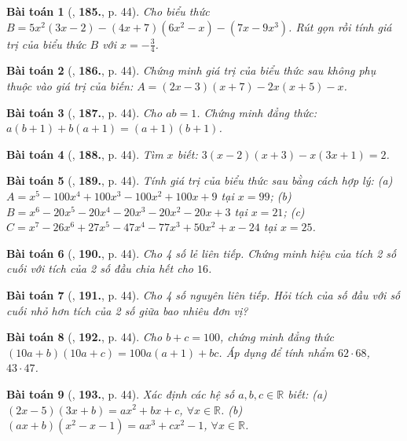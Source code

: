 \documentclass{article}
\numberwithin{equation}{section}
\newtheorem{baitoan}{Bài toán}
\begin{document}
\begin{baitoan}[\cite{Tuyen_Toan_7}, \textbf{185.}, p. 44]
	Cho biểu thức $B = 5x^2(3x - 2) - (4x + 7)(6x^2 - x) - (7x - 9x^3)$. Rút gọn rồi  tính giá trị của biểu thức $B$ với $x = -\frac{3}{4}$.
\end{baitoan}

\begin{baitoan}[\cite{Tuyen_Toan_7}, \textbf{186.}, p. 44]
	Chứng minh giá trị của biểu thức sau không phụ thuộc vào giá trị của biến: $A = (2x - 3)(x + 7) - 2x(x + 5) - x$. 
\end{baitoan}

\begin{baitoan}[\cite{Tuyen_Toan_7}, \textbf{187.}, p. 44]
	Cho $ab = 1$. Chứng minh đẳng thức: $a(b + 1) + b(a + 1) = (a + 1)(b + 1)$.
\end{baitoan}

\begin{baitoan}[\cite{Tuyen_Toan_7}, \textbf{188.}, p. 44]
	Tìm $x$ biết: $3(x - 2)(x + 3) - x(3x + 1) = 2$.
\end{baitoan}

\begin{baitoan}[\cite{Tuyen_Toan_7}, \textbf{189.}, p. 44]
	Tính giá trị của biểu thức sau bằng cách hợp lý: (a) $A = x^5 - 100x^4 + 100x^3 - 100x^2 + 100x + 9$ tại $x = 99$; (b) $B = x^6 - 20x^5 - 20x^4 - 20x^3 - 20x^2 - 20x + 3$ tại $x = 21$; (c) $C = x^7 - 26x^6 + 27x^5 - 47x^4 - 77x^3 + 50x^2 + x - 24$ tại $x = 25$.
\end{baitoan}

\begin{baitoan}[\cite{Tuyen_Toan_7}, \textbf{190.}, p. 44]
	Cho 4 số lẻ liên tiếp. Chứng minh hiệu của tích 2 số cuối với tích của 2 số đầu chia hết cho $16$.
\end{baitoan}

\begin{baitoan}[\cite{Tuyen_Toan_7}, \textbf{191.}, p. 44]
	Cho 4 số nguyên liên tiếp. Hỏi tích của số đầu với số cuối nhỏ hơn tích của 2 số giữa bao nhiêu đơn vị?
\end{baitoan}

\begin{baitoan}[\cite{Tuyen_Toan_7}, \textbf{192.}, p. 44]
	Cho $b + c = 100$, chứng minh đẳng thức $(10a + b)(10a + c) = 100a(a + 1) + bc$. Áp dụng để tính nhẩm $62\cdot68$, $43\cdot47$.
\end{baitoan}

\begin{baitoan}[\cite{Tuyen_Toan_7}, \textbf{193.}, p. 44]
	Xác định các hệ số $a,b,c\in\mathbb{R}$ biết: (a) $(2x - 5)(3x + b) = ax^2 + bx + c$, $\forall x\in\mathbb{R}$. (b) $(ax + b)(x^2 - x - 1) = ax^3 + cx^2 - 1$, $\forall x\in\mathbb{R}$.
\end{baitoan}
\end{document}
